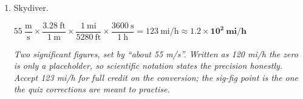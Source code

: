 \documentclass[12pt, twoside]{article}
\begin{document}
\begin{enumerate}[itemsep=0.25cm]
\item Skydiver.

  $55~\dfrac{\text{m}}{\text{s}} \times \dfrac{3.28~\text{ft}}{1~\text{m}}
  \times \dfrac{1~\text{mi}}{5280~\text{ft}} \times \dfrac{3600~\text{s}}{1~\text{h}}
  = 123~\text{mi/h} \approx \mathbf{1.2 \times 10^{2}~\textbf{mi/h}}$

  \emph{Two significant figures, set by ``about 55 m/s''. Written as 120 mi/h the zero
  is only a placeholder, so scientific notation states the precision honestly. Accept
  123 mi/h for full credit on the conversion; the sig-fig point is the one the quiz
  corrections are meant to practise.}

\end{enumerate}
\end{document}
